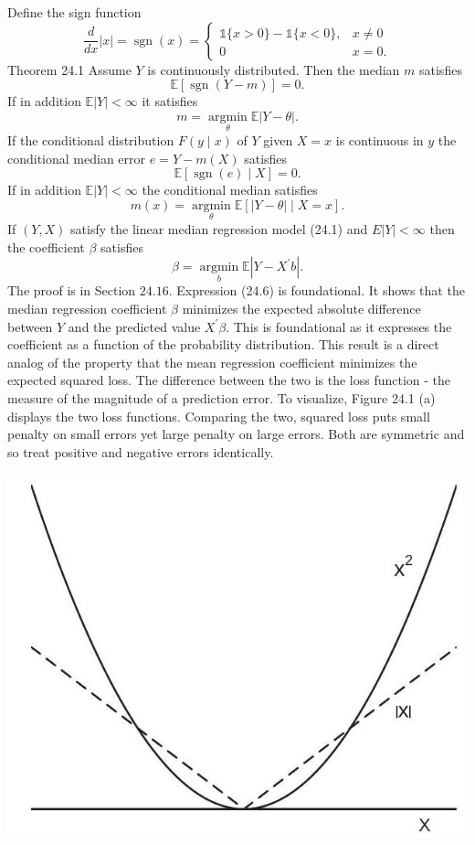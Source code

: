 \documentclass[10pt]{article}
\begin{document}
Define the sign function
$$
\frac{d}{d x}|x|=\operatorname{sgn}(x)=\left\{\begin{array}{cc}
\mathbb{1}\{x>0\}-\mathbb{1}\{x<0\}, & x \neq 0 \\
0 & x=0 .
\end{array}\right.
$$
Theorem 24.1 Assume $Y$ is continuously distributed. Then the median $m$ satisfies
$$
\mathbb{E}[\operatorname{sgn}(Y-m)]=0 .
$$
If in addition $\mathbb{E}|Y|<\infty$ it satisfies
$$
m=\underset{\theta}{\operatorname{argmin}} \mathbb{E}|Y-\theta| .
$$
If the conditional distribution $F(y \mid x)$ of $Y$ given $X=x$ is continuous in $y$ the conditional median error $e=Y-m(X)$ satisfies
$$
\mathbb{E}[\operatorname{sgn}(e) \mid X]=0 .
$$
If in addition $\mathbb{E}|Y|<\infty$ the conditional median satisfies
$$
m(x)=\underset{\theta}{\operatorname{argmin}} \mathbb{E}[|Y-\theta| \mid X=x] .
$$
If $(Y, X)$ satisfy the linear median regression model (24.1) and $E|Y|<\infty$ then the coefficient $\beta$ satisfies
$$
\beta=\underset{b}{\operatorname{argmin}} \mathbb{E}\left|Y-X^{\prime} b\right| .
$$
The proof is in Section $24.16$. Expression (24.6) is foundational. It shows that the median regression coefficient $\beta$ minimizes the expected absolute difference between $Y$ and the predicted value $X^{\prime} \beta$. This is foundational as it expresses the coefficient as a function of the probability distribution. This result is a direct analog of the property that the mean regression coefficient minimizes the expected squared loss. The difference between the two is the loss function - the measure of the magnitude of a prediction error. To visualize, Figure 24.1 (a) displays the two loss functions. Comparing the two, squared loss puts small penalty on small errors yet large penalty on large errors. Both are symmetric and so treat positive and negative errors identically.

\includegraphics[max width=\textwidth]{2022_10_23_47027c652ef567187a65g-03}
\end{document}
